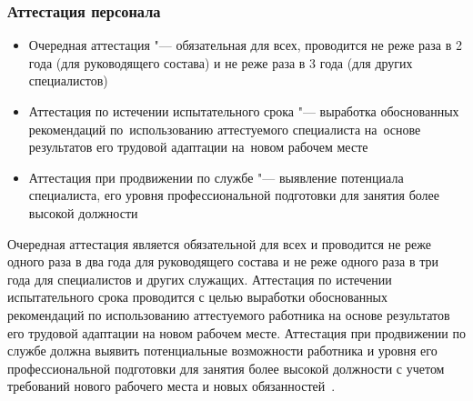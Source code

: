 \documentclass{../industrial-development}
\begin{document}

\begin{frame} \frametitle{Аттестация персонала}
  \begin{itemize}
	\item \alert{Очередная аттестация} "---  обязательная для всех, проводится не реже раза в 2 года (для руководящего состава) и не реже раза в 3 года (для других специалистов)

\item \alert{Аттестация по истечении испытательного срока} "---  выработка обоснованных рекомендаций по~использованию аттестуемого специалиста на~основе результатов его трудовой адаптации на~новом рабочем месте

\item \alert{Аттестация при продвижении по службе} "---  выявление потенциала специалиста, его уровня профессиональной подготовки для занятия более высокой должности
  \end{itemize}
\end{frame}

\lecturenotes

\alert{Очередная аттестация} является обязательной для всех и проводится не реже одного раза в два года для руководящего состава и не реже одного раза в три года для специалистов и других служащих. \alert{Аттестация по истечении испытательного срока} проводится с целью выработки обоснованных рекомендаций по использованию аттестуемого работника на основе результатов его трудовой адаптации на новом рабочем месте. \alert{Аттестация при продвижении по службе} должна выявить потенциальные возможности работника и уровня его профессиональной подготовки для занятия более высокой должности с учетом требований нового рабочего места и новых обязанностей~\cite[с.~419--420]{Kibanov}.


\end{document}
